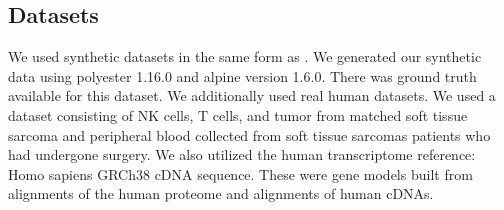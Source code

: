 \subsection{Datasets}
We used synthetic datasets in the same form as \cite{patro_salmon_2017}. 
We generated our synthetic data using polyester 1.16.0 and alpine version 1.6.0. 
\cite{frazee2015polyester}\cite{love2016modeling} There was ground truth available for this dataset. We additionally used real human datasets. 
We used a dataset consisting of NK cells, T cells, and tumor from matched soft tissue sarcoma and peripheral 
blood collected from soft tissue sarcomas patients who had undergone surgery. 
\cite{judge_transcriptome_2022} We also utilized the human transcriptome reference: Homo sapiens GRCh38 cDNA sequence. 
These were gene models built from alignments of the human proteome and alignments of human cDNAs. \cite{noauthor_homo_sapiens_nodate}
